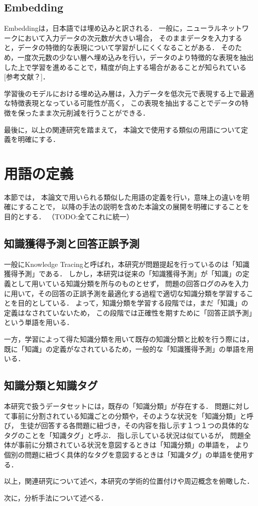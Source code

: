 \subsection{Embedding}
Embeddingは，日本語では埋め込みと訳される．
一般に，ニューラルネットワークにおいて入力データの次元数が大きい場合，
そのままデータを入力すると，データの特徴的な表現について学習がしにくくなることがある．
そのため，一度次元数の少ない層へ埋め込みを行い，データのより特徴的な表現を抽出した上で学習を進めることで，精度が向上する場合があることが知られている[参考文献？]．

学習後のモデルにおける埋め込み層は，入力データを低次元で表現する上で最適な特徴表現となっている可能性が高く，
この表現を抽出することでデータの特徴を保ったまま次元削減を行うことができる．


\vvspace


最後に，以上の関連研究を踏まえて，
本論文で使用する類似の用語について定義を明確にする．

\section{用語の定義}
本節では，
本論文で用いられる類似した用語の定義を行い，意味上の違いを明確にすることで，
以降の手法の説明を含めた本論文の展開を明確にすることを目的とする．
（TODO:全てこれに統一）

\subsection{知識獲得予測と回答正誤予測}
一般にKnowledge Tracingと呼ばれ，本研究が問題提起を行っているのは「知識獲得予測」である．
しかし，本研究は従来の「知識獲得予測」が「知識」の定義として用いている知識分類を所与のものとせず，
問題の回答ログのみを入力に用いて，その回答の正誤予測を最適化する過程で適切な知識分類を学習することを目的としている．
よって，知識分類を学習する段階では，まだ「知識」の定義はなされていないため，
この段階では正確性を期すために「回答正誤予測」という単語を用いる．

一方，学習によって得た知識分類を用いて既存の知識分類と比較を行う際には，
既に「知識」の定義がなされているため，一般的な「知識獲得予測」の単語を用いる．

\subsection{知識分類と知識タグ}
本研究で扱うデータセットには，既存の「知識分類」が存在する．
問題に対して事前に分割されている知識ごとの分類や，そのような状況を「知識分類」と呼び，
生徒が回答する各問題に紐づき，その内容を指し示す１つ１つの具体的なタグのことを「知識タグ」と呼ぶ．
指し示している状況は似ているが，
問題全体が事前に分類されている状況を意図するときは「知識分類」の単語を，
より個別の問題に紐づく具体的なタグを意図するときは「知識タグ」の単語を使用する．



以上，関連研究について述べ，本研究の学術的位置付けや周辺概念を俯瞰した．

次に，分析手法について述べる．




